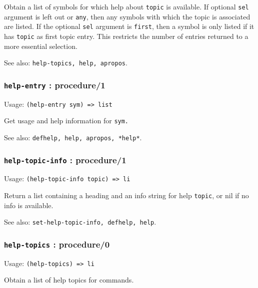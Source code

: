 \documentclass[
]{article}
\newcommand{\passthrough}[1]{#1}
\begin{document}
Obtain a list of symbols for which help about
\passthrough{\lstinline!topic!} is available. If optional
\passthrough{\lstinline!sel!} argument is left out or
\passthrough{\lstinline!any!}, then any symbols with which the topic is
associated are listed. If the optional \passthrough{\lstinline!sel!}
argument is \passthrough{\lstinline!first!}, then a symbol is only
listed if it has \passthrough{\lstinline!topic!} as first topic entry.
This restricts the number of entries returned to a more essential
selection.

See also: \passthrough{\lstinline!help-topics, help, apropos!}.

\hypertarget{help-entry-procedure1}{%
\subsubsection{\texorpdfstring{\texttt{help-entry} :
procedure/1}{help-entry : procedure/1}}\label{help-entry-procedure1}}

Usage: \passthrough{\lstinline!(help-entry sym) => list!}

Get usage and help information for \passthrough{\lstinline!sym.!}

See also: \passthrough{\lstinline!defhelp, help, apropos, *help*!}.

\hypertarget{help-topic-info-procedure1}{%
\subsubsection{\texorpdfstring{\texttt{help-topic-info} :
procedure/1}{help-topic-info : procedure/1}}\label{help-topic-info-procedure1}}

Usage: \passthrough{\lstinline!(help-topic-info topic) => li!}

Return a list containing a heading and an info string for help
\passthrough{\lstinline!topic!}, or nil if no info is available.

See also: \passthrough{\lstinline!set-help-topic-info, defhelp, help!}.

\hypertarget{help-topics-procedure0}{%
\subsubsection{\texorpdfstring{\texttt{help-topics} :
procedure/0}{help-topics : procedure/0}}\label{help-topics-procedure0}}

Usage: \passthrough{\lstinline!(help-topics) => li!}

Obtain a list of help topics for commands.
\end{document}
